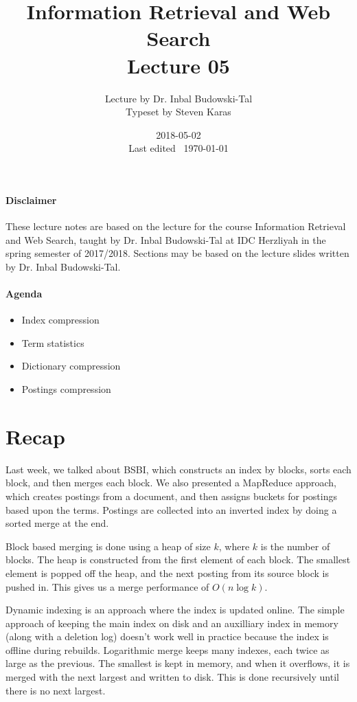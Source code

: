 \documentclass{idc_msc}
\title{Information Retrieval and Web Search\\\large Lecture 05}
\date{2018-05-02 \\ Last edited \currenttime\ \today}
\author{Lecture by Dr. Inbal Budowski-Tal\\Typeset by Steven Karas}
\begin{document}
\maketitle

\paragraph{Disclaimer}

These lecture notes are based on the lecture for the course Information Retrieval and Web Search, taught by Dr. Inbal Budowski-Tal at IDC Herzliyah in the spring semester of 2017/2018.
Sections may be based on the lecture slides written by Dr. Inbal Budowski-Tal.

\paragraph{Agenda}

\begin{itemize}
  \item Index compression
  \item Term statistics
  \item Dictionary compression
  \item Postings compression
\end{itemize}

\nocite{manning2008introduction}

\section{Recap}

Last week, we talked about BSBI, which constructs an index by blocks, sorts each block, and then merges each block.
We also presented a MapReduce approach, which creates postings from a document, and then assigns buckets for postings based upon the terms. Postings are collected into an inverted index by doing a sorted merge at the end.

Block based merging is done using a heap of size \(k\), where \(k\) is the number of blocks.
The heap is constructed from the first element of each block.
The smallest element is popped off the heap, and the next posting from its source block is pushed in.
This gives us a merge performance of \(O(n \log k)\).

Dynamic indexing is an approach where the index is updated online.
The simple approach of keeping the main index on disk and an auxilliary index in memory (along with a deletion log) doesn't work well in practice because the index is offline during rebuilds.
Logarithmic merge keeps many indexes, each twice as large as the previous.
The smallest is kept in memory, and when it overflows, it is merged with the next largest and written to disk.
This is done recursively until there is no next largest.
\end{document}

